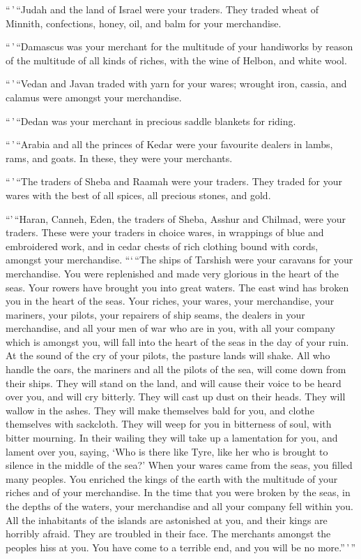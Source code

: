 ``\,'\,``Judah and the land of Israel were your traders.
They traded wheat of Minnith, confections, honey, oil, and balm for your
merchandise.

 ``\,'\,``Damascus was your merchant for the multitude of
your handiworks by reason of the multitude of all kinds of riches, with
the wine of Helbon, and white wool.

 ``\,'\,``Vedan and Javan traded with yarn for your
wares; wrought iron, cassia, and calamus were amongst your merchandise.

 ``\,'\,``Dedan was your merchant in precious saddle
blankets for riding.

 ``\,'\,``Arabia and all the princes of Kedar were your
favourite dealers in lambs, rams, and goats. In these, they were your
merchants.

 ``\,'\,``The traders of Sheba and Raamah were your
traders. They traded for your wares with the best of all spices, all
precious stones, and gold.

 ``'\,``Haran, Canneh, Eden, the traders of Sheba, Asshur
and Chilmad, were your traders.  These were your traders
in choice wares, in wrappings of blue and embroidered work, and in cedar
chests of rich clothing bound with cords, amongst your merchandise.
 ```\,``The ships of Tarshish were your caravans for your
merchandise. You were replenished and made very glorious in the heart of
the seas.  Your rowers have brought you into great
waters. The east wind has broken you in the heart of the seas.
 Your riches, your wares, your merchandise, your
mariners, your pilots, your repairers of ship seams, the dealers in your
merchandise, and all your men of war who are in you, with all your
company which is amongst you, will fall into the heart of the seas in
the day of your ruin.  At the sound of the cry of your
pilots, the pasture lands will shake.  All who handle the
oars, the mariners and all the pilots of the sea, will come down from
their ships. They will stand on the land,  and will cause
their voice to be heard over you, and will cry bitterly. They will cast
up dust on their heads. They will wallow in the ashes. 
They will make themselves bald for you, and clothe themselves with
sackcloth. They will weep for you in bitterness of soul, with bitter
mourning.  In their wailing they will take up a
lamentation for you, and lament over you, saying, `Who is there like
Tyre, like her who is brought to silence in the middle of the sea?'
 When your wares came from the seas, you filled many
peoples. You enriched the kings of the earth with the multitude of your
riches and of your merchandise.  In the time that you
were broken by the seas, in the depths of the waters, your merchandise
and all your company fell within you.  All the
inhabitants of the islands are astonished at you, and their kings are
horribly afraid. They are troubled in their face.  The
merchants amongst the peoples hiss at you. You have come to a terrible
end, and you will be no more.''\,'\,''

